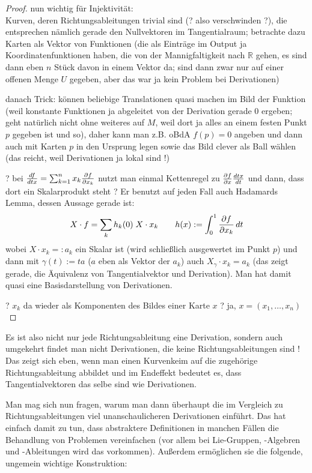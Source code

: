 \documentclass[../H_Analysis_main.tex]{subfiles}
\begin{document}
\begin{proof}
nun wichtig für Injektivität:\\
Kurven, deren Richtungsableitungen trivial sind (? also verschwinden ?), die entsprechen nämlich gerade den Nullvektoren im Tangentialraum; betrachte dazu Karten als Vektor von Funktionen (die als Einträge im Output ja Koordinatenfunktionen haben, die von der Mannigfaltigkeit nach $\mathbb{R}$ gehen, es sind dann eben $n$ Stück davon in einem Vektor da; sind dann zwar nur auf einer offenen Menge $U$ gegeben, aber das war ja kein Problem bei Derivationen)

danach Trick: können beliebige Translationen quasi machen im Bild der Funktion (weil konstante Funktionen ja abgeleitet von der Derivation gerade 0 ergeben; geht natürlich nicht ohne weiteres auf $M$, weil dort ja alles an einem festen Punkt $p$ gegeben ist und so), daher kann man z.B. oBdA $f(p) = 0$ angeben und dann auch mit Karten $p$ in den Ursprung legen sowie das Bild clever als Ball wählen (das reicht, weil Derivationen ja lokal sind !)


? bei $\dv{f}{tx} = \sum_{k = 1}^n x_k \pdv{f}{x_k}$ nutzt man einmal Kettenregel zu $\pdv{f}{x} \dv{tx}{t}$ und dann, dass dort ein Skalarprodukt steht ? Er benutzt auf jeden Fall auch Hadamards Lemma, dessen Aussage gerade ist:
\begin{equation}
X \cdot f = \sum_k h_k(0) \; X \cdot x_k \qquad h(x) := \int_0^1 \pdv{f}{x_k}(tx) \, dt
\end{equation}
wobei $X \cdot x_k =: a_k$ ein Skalar ist (wird schließlich ausgewertet im Punkt $p$) und dann mit $\gamma(t) := t a$ ($a$ eben als Vektor der $a_k$) auch $X_{\gamma} \cdot x_k = a_k$ (das zeigt gerade, die Äquivalenz von Tangentialvektor und Derivation). Man hat damit quasi eine Basisdarstellung von Derivationen.

? $x_k$ da wieder als Komponenten des Bildes einer Karte $x$ ? ja, $x = (x_1, \dots, x_n)$
\end{proof}

Es ist also nicht nur jede Richtungsableitung eine Derivation, sondern auch umgekehrt findet man nicht Derivationen, die keine Richtungsableitungen sind ! Das zeigt sich eben, wenn man einen Kurvenkeim auf die zugehörige Richtungsableitung abbildet und im Endeffekt bedeutet es, dass Tangentialvektoren das selbe sind wie Derivationen.

Man mag sich nun fragen, warum man dann überhaupt die im Vergleich zu Richtungsableitungen viel unanschaulicheren Derivationen einführt. Das hat einfach damit zu tun, dass abstraktere Definitionen in manchen Fällen die Behandlung von Problemen vereinfachen (vor allem bei Lie-Gruppen, -Algebren und -Ableitungen wird das vorkommen). Außerdem ermöglichen sie die folgende, ungemein wichtige Konstruktion:
\end{document}
